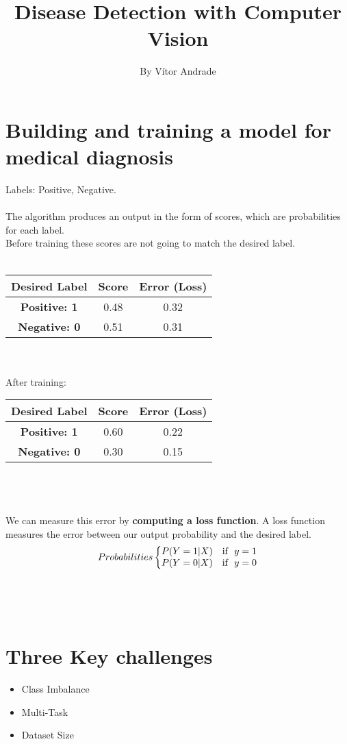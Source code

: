 \documentclass[a4paper,12pt]{article}
\title{Disease Detection with Computer Vision}
\author{By V\'itor Andrade}
\begin{document}
\maketitle

\section{Building and training a model for medical diagnosis}


Labels: Positive, Negative.\\\\
The algorithm produces an output in the form of scores, which are probabilities for each label.\\
Before training these scores are not going to match the desired label.\\\\
\begin{tabular}{|c c c|}
\hline
Desired Label & Score & Error (Loss) \\
\hline
\textbf{Positive: 1} & 0.48 & 0.32 \\
\textbf{Negative: 0} & 0.51 & 0.31 \\
\hline
\end{tabular}\\\\
After training:\\
\begin{tabular}{|c c c|}
	\hline
	Desired Label & Score & Error (Loss) \\
	\hline
	\textbf{Positive: 1} & 0.60 & 0.22 \\
	\textbf{Negative: 0} & 0.30 & 0.15 \\
	\hline
\end{tabular}\\\\
\\
We can measure this error by \textbf{computing a loss function}. A loss function measures the error between our output probability and the desired label.
\begin{equation}
Probabilities\left\{
\begin{array}{@{}ll@{}}
P(Y=1|X) & \text{if}\ \ y=1 \nonumber \\
P(Y=0|X) & \text{if}\ \ y=0
\end{array}\right.
\end{equation} 
\\\\\\
\section{Three Key challenges}
\begin{itemize}
	\item Class Imbalance
	\item Multi-Task
	\item Dataset Size
\end{itemize}
\end{document}
